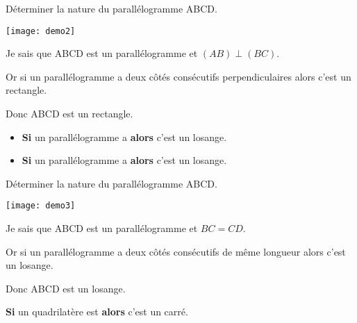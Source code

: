 	\begin{myex}
		Déterminer la nature du parallélogramme ABCD.
		
		\begin{center}
			\texttt{[image: demo2]}
		\end{center}
		
		Je sais que ABCD est un parallélogramme et $(AB) \perp (BC)$.
		
		Or si un parallélogramme a deux côtés consécutifs perpendiculaires alors c'est un rectangle.
		
		Donc ABCD est un rectangle.
		
		
	\end{myex}

	\begin{myprops}
		\begin{itemize}
			\item \textbf{Si} un parallélogramme a  \textbf{alors} c'est un losange.
			\item \textbf{Si} un parallélogramme a  \textbf{alors} c'est un losange.
		\end{itemize}
		
	\end{myprops}

	\begin{myex}
		Déterminer la nature du parallélogramme ABCD.
		
		\begin{center}
			\texttt{[image: demo3]}
		\end{center}
		
		Je sais que ABCD est un parallélogramme et $BC=CD$.
		
		Or si un parallélogramme a deux côtés consécutifs de même longueur alors c'est un losange.
		
		Donc ABCD est un losange.
		
		
	\end{myex}

\newpage

	\begin{myprop}
		\textbf{Si} un quadrilatère est  \textbf{alors} c'est un carré.
	\end{myprop}


	


